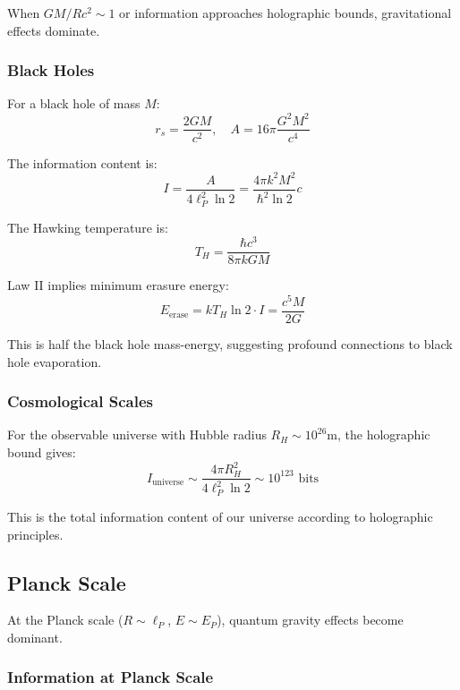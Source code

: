\documentclass[11pt,a4paper]{article}
\theoremstyle{plain}
\theoremstyle{definition}
\theoremstyle{remark}
\begin{document}
When $GM/Rc^2 \sim 1$ or information approaches holographic bounds, gravitational effects dominate.

\subsubsection{Black Holes}

For a black hole of mass $M$:
\begin{equation}
r_s = \frac{2GM}{c^2}, \quad A = 16\pi\frac{G^2M^2}{c^4}
\end{equation}

The information content is:
\begin{equation}
I = \frac{A}{4\ell_P^2\ln 2} = \frac{4\pi k^2M^2}{\hbar^2\ln 2}c
\end{equation}

The Hawking temperature is:
\begin{equation}
T_H = \frac{\hbar c^3}{8\pi kGM}
\end{equation}

Law II implies minimum erasure energy:
\begin{equation}
E_{\text{erase}} = kT_H\ln 2\cdot I = \frac{c^5M}{2G}
\end{equation}

This is half the black hole mass-energy, suggesting profound connections to black hole evaporation.

\subsubsection{Cosmological Scales}

For the observable universe with Hubble radius $R_H \sim 10^{26}$m, the holographic bound gives:
\begin{equation}
I_{\text{universe}} \sim \frac{4\pi R_H^2}{4\ell_P^2\ln 2} \sim 10^{123}\text{ bits}
\end{equation}

This is the total information content of our universe according to holographic principles.

\subsection{Planck Scale}

At the Planck scale ($R \sim \ell_P$, $E \sim E_P$), quantum gravity effects become dominant.

\subsubsection{Information at Planck Scale}
\end{document}
